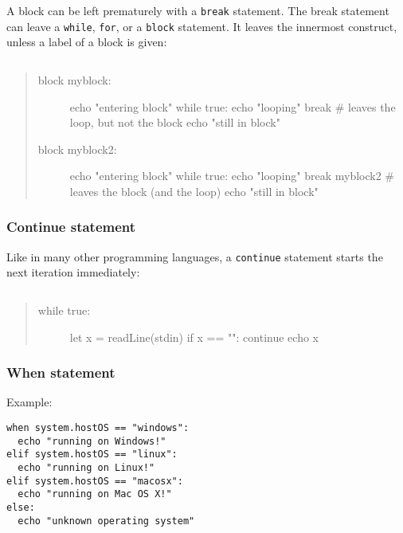 A block can be left prematurely with a \texttt{break} statement. The
break statement can leave a \texttt{while}, \texttt{for}, or a
\texttt{block} statement. It leaves the innermost construct, unless a
label of a block is given:

\begin{verbatim}
\end{verbatim}

\begin{quote}
\begin{description}
\item[block myblock:]
echo "entering block" while true: echo "looping" break \# leaves the
loop, but not the block echo "still in block"
\item[block myblock2:]
echo "entering block" while true: echo "looping" break myblock2 \#
leaves the block (and the loop) echo "still in block"
\end{description}
\end{quote}

\hypertarget{continue-statement}{%
\subsubsection{Continue statement}\label{continue-statement}}

Like in many other programming languages, a \texttt{continue} statement
starts the next iteration immediately:

\begin{verbatim}
\end{verbatim}

\begin{quote}
\begin{description}
\item[while true:]
let x = readLine(stdin) if x == "": continue echo x
\end{description}
\end{quote}

\hypertarget{when-statement}{%
\subsubsection{When statement}\label{when-statement}}

Example:

\begin{verbatim}
when system.hostOS == "windows":
  echo "running on Windows!"
elif system.hostOS == "linux":
  echo "running on Linux!"
elif system.hostOS == "macosx":
  echo "running on Mac OS X!"
else:
  echo "unknown operating system"
\end{verbatim}

